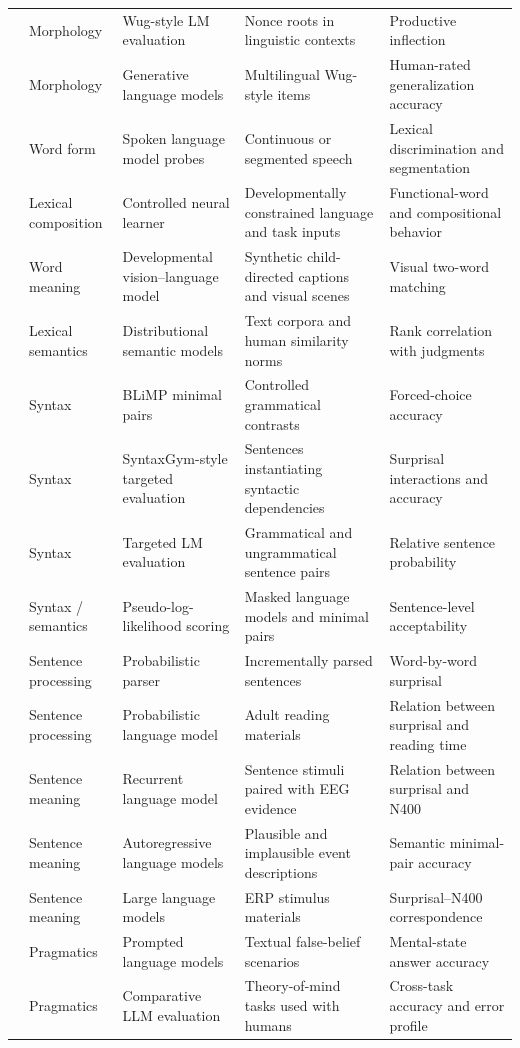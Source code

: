 \begin{longtable}{@{}p{}p{}p{}p{}p{}@{}}
\citet{weissweiler2023counting} & Morphology & Wug-style LM evaluation & Nonce roots in linguistic contexts & Productive inflection \\
\citet{anh2024morphology} & Morphology & Generative language models & Multilingual Wug-style items & Human-rated generalization accuracy \\
\citet{nguyen2022word} & Word form & Spoken language model probes & Continuous or segmented speech & Lexical discrimination and segmentation \\
\citet{Portelance2024} & Lexical composition & Controlled neural learner & Developmentally constrained language and task inputs & Functional-word and compositional behavior \\
\citet{Wang2025} & Word meaning & Developmental vision--language model & Synthetic child-directed captions and visual scenes & Visual two-word matching \\
\citet{Lenci2022} & Lexical semantics & Distributional semantic models & Text corpora and human similarity norms & Rank correlation with judgments \\
\citet{warstadt2020blimp} & Syntax & BLiMP minimal pairs & Controlled grammatical contrasts & Forced-choice accuracy \\
\citet{Hu2020} & Syntax & SyntaxGym-style targeted evaluation & Sentences instantiating syntactic dependencies & Surprisal interactions and accuracy \\
\citet{marvin2018targeted} & Syntax & Targeted LM evaluation & Grammatical and ungrammatical sentence pairs & Relative sentence probability \\
\citet{Salazar2020} & Syntax / semantics & Pseudo-log-likelihood scoring & Masked language models and minimal pairs & Sentence-level acceptability \\
\citet{hale2001probabilistic} & Sentence processing & Probabilistic parser & Incrementally parsed sentences & Word-by-word surprisal \\
\citet{SmithLevy2013} & Sentence processing & Probabilistic language model & Adult reading materials & Relation between surprisal and reading time \\
\citet{frank2015erp} & Sentence meaning & Recurrent language model & Sentence stimuli paired with EEG evidence & Relation between surprisal and N400 \\
\citet{kauf2023event} & Sentence meaning & Autoregressive language models & Plausible and implausible event descriptions & Semantic minimal-pair accuracy \\
\citet{michaelov2024strong} & Sentence meaning & Large language models & ERP stimulus materials & Surprisal--N400 correspondence \\
\citet{Kosinski2023} & Pragmatics & Prompted language models & Textual false-belief scenarios & Mental-state answer accuracy \\
\citet{Strachan2024} & Pragmatics & Comparative LLM evaluation & Theory-of-mind tasks used with humans & Cross-task accuracy and error profile \\
\end{longtable}
\endgroup

